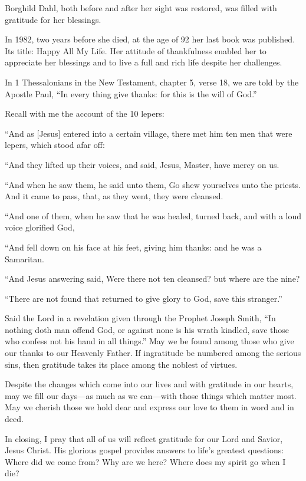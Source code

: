 \documentclass[letterpaper, 11pt]{report}
\begin{document}
Borghild Dahl, both before and after her sight was restored, was filled with gratitude for her blessings.

In 1982, two years before she died, at the age of 92 her last book was published. Its title: Happy All My Life. Her attitude of thankfulness enabled her to appreciate her blessings and to live a full and rich life despite her challenges.

In 1 Thessalonians in the New Testament, chapter 5, verse 18, we are told by the Apostle Paul, “In every thing give thanks: for this is the will of God.”

Recall with me the account of the 10 lepers:

“And as [Jesus] entered into a certain village, there met him ten men that were lepers, which stood afar off:

“And they lifted up their voices, and said, Jesus, Master, have mercy on us.

“And when he saw them, he said unto them, Go shew yourselves unto the priests. And it came to pass, that, as they went, they were cleansed.

“And one of them, when he saw that he was healed, turned back, and with a loud voice glorified God,

“And fell down on his face at his feet, giving him thanks: and he was a Samaritan.

“And Jesus answering said, Were there not ten cleansed? but where are the nine?

“There are not found that returned to give glory to God, save this stranger.”

Said the Lord in a revelation given through the Prophet Joseph Smith, “In nothing doth man offend God, or against none is his wrath kindled, save those who confess not his hand in all things.” May we be found among those who give our thanks to our Heavenly Father. If ingratitude be numbered among the serious sins, then gratitude takes its place among the noblest of virtues.

Despite the changes which come into our lives and with gratitude in our hearts, may we fill our days—as much as we can—with those things which matter most. May we cherish those we hold dear and express our love to them in word and in deed.

In closing, I pray that all of us will reflect gratitude for our Lord and Savior, Jesus Christ. His glorious gospel provides answers to life’s greatest questions: Where did we come from? Why are we here? Where does my spirit go when I die?
\end{document}
